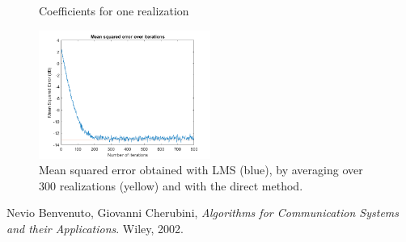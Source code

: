 \documentclass[a4paper, 12pt]{report}
\begin{document}
\begin{figure}[H]
	\centering
	\caption{Coefficients for one realization}
	\label{fig:coeff1}
\end{figure}

\begin{figure}[H]
	\centering
	\includegraphics[width=0.5\textwidth]{error_300real}
	\caption{Mean squared error obtained with LMS (blue), by averaging over 300 realizations (yellow) and with the direct method.}
	\label{fig:err300}
\end{figure}

\begin{thebibliography}{15}
	Nevio Benvenuto, Giovanni Cherubini,
	\textit{Algorithms for Communication Systems and their Applications}. 
	Wiley, 2002.
\end{thebibliography}
\end{document}
